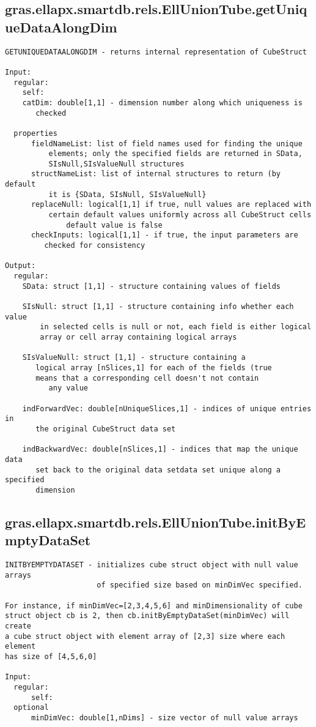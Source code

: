\subsection{\texorpdfstring{gras.ellapx.smartdb.rels.EllUnionTube.getUniqueDataAlongDim}{getUniqueDataAlongDim}}\label{method:gras.ellapx.smartdb.rels.EllUnionTube.getUniqueDataAlongDim}
\begin{verbatim}
GETUNIQUEDATAALONGDIM - returns internal representation of CubeStruct

Input:
  regular:
    self:
    catDim: double[1,1] - dimension number along which uniqueness is
       checked

  properties
      fieldNameList: list of field names used for finding the unique
          elements; only the specified fields are returned in SData,
          SIsNull,SIsValueNull structures
      structNameList: list of internal structures to return (by default
          it is {SData, SIsNull, SIsValueNull}
      replaceNull: logical[1,1] if true, null values are replaced with
          certain default values uniformly across all CubeStruct cells
              default value is false
      checkInputs: logical[1,1] - if true, the input parameters are
         checked for consistency

Output:
  regular:
    SData: struct [1,1] - structure containing values of fields

    SIsNull: struct [1,1] - structure containing info whether each value
        in selected cells is null or not, each field is either logical
        array or cell array containing logical arrays

    SIsValueNull: struct [1,1] - structure containing a
       logical array [nSlices,1] for each of the fields (true
       means that a corresponding cell doesn't not contain
          any value

    indForwardVec: double[nUniqueSlices,1] - indices of unique entries in
       the original CubeStruct data set

    indBackwardVec: double[nSlices,1] - indices that map the unique data
       set back to the original data setdata set unique along a specified
       dimension
\end{verbatim}
\subsection{\texorpdfstring{gras.ellapx.smartdb.rels.EllUnionTube.initByEmptyDataSet}{initByEmptyDataSet}}\label{method:gras.ellapx.smartdb.rels.EllUnionTube.initByEmptyDataSet}
\begin{verbatim}
INITBYEMPTYDATASET - initializes cube struct object with null value arrays
                     of specified size based on minDimVec specified.

For instance, if minDimVec=[2,3,4,5,6] and minDimensionality of cube
struct object cb is 2, then cb.initByEmptyDataSet(minDimVec) will create
a cube struct object with element array of [2,3] size where each element
has size of [4,5,6,0]

Input:
  regular:
      self:
  optional
      minDimVec: double[1,nDims] - size vector of null value arrays
\end{verbatim}
